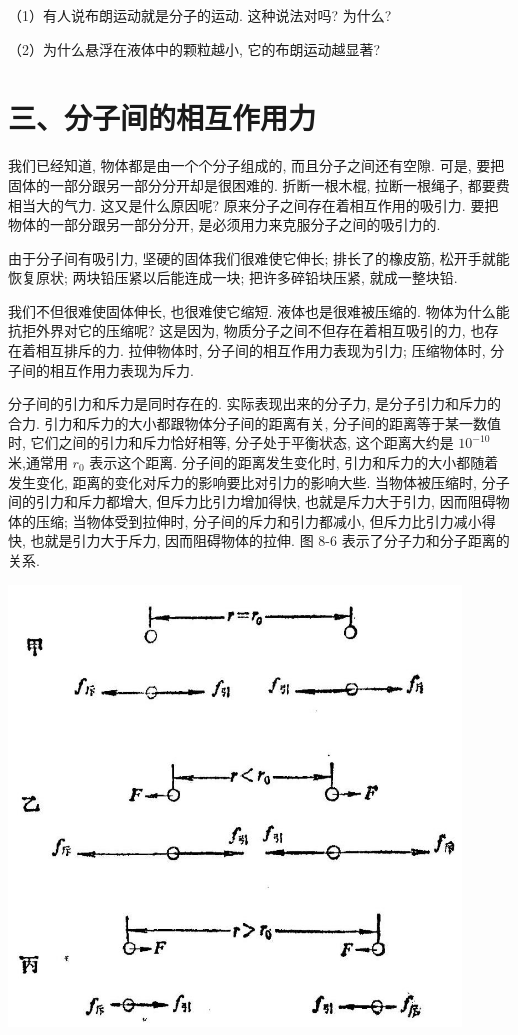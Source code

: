 \documentclass[10pt]{article}
\begin{document}
（1）有人说布朗运动就是分子的运动. 这种说法对吗? 为什么?

（2）为什么悬浮在液体中的颗粒越小, 它的布朗运动越显著?

\section*{三、分子间的相互作用力}

我们已经知道, 物体都是由一个个分子组成的, 而且分子之间还有空隙. 可是, 要把固体的一部分跟另一部分分开却是很困难的. 折断一根木棍, 拉断一根绳子, 都要费相当大的气力. 这又是什么原因呢? 原来分子之间存在着相互作用的吸引力. 要把物体的一部分跟另一部分分开, 是必须用力来克服分子之间的吸引力的.

由于分子间有吸引力, 坚硬的固体我们很难使它伸长; 排长了的橡皮筋, 松开手就能恢复原状; 两块铅压紧以后能连成一块; 把许多碎铅块压紧, 就成一整块铅.

我们不但很难使固体伸长, 也很难使它缩短. 液体也是很难被压缩的. 物体为什么能抗拒外界对它的压缩呢? 这是因为, 物质分子之间不但存在着相互吸引的力, 也存在着相互排斥的力. 拉伸物体时, 分子间的相互作用力表现为引力; 压缩物体时, 分子间的相互作用力表现为斥力.

分子间的引力和斥力是同时存在的. 实际表现出来的分子力, 是分子引力和斥力的合力. 引力和斥力的大小都跟物体分子间的距离有关, 分子间的距离等于某一数值时, 它们之间的引力和斥力恰好相等, 分子处于平衡状态, 这个距离大约是 \({10}^{-{10}}\) 米,通常用 \({r}_{0}\) 表示这个距离. 分子间的距离发生变化时, 引力和斥力的大小都随着发生变化, 距离的变化对斥力的影响要比对引力的影响大些. 当物体被压缩时, 分子间的引力和斥力都增大, 但斥力比引力增加得快, 也就是斥力大于引力, 因而阻碍物体的压缩; 当物体受到拉伸时, 分子间的斥力和引力都减小, 但斥力比引力减小得快, 也就是引力大于斥力, 因而阻碍物体的拉伸. 图 8-6 表示了分子力和分子距离的关系.

\begin{center}
\includegraphics[max width=0.9\textwidth]{images/01912d55-147c-70aa-b0e0-1782a122f948_241_170453.jpg}
\end{center}
\end{document}
